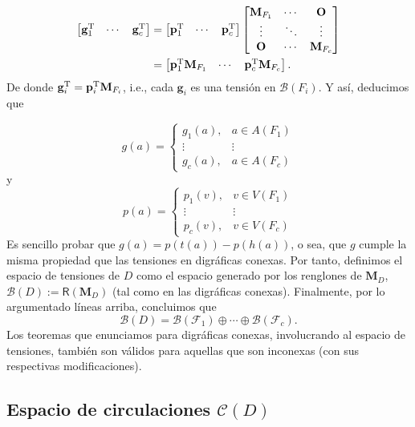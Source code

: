 \begin{align*}
    \begin{bmatrix}
\mathbf{g}_{1}^{\textnormal{T}} & \cdots  & \mathbf{g}_{c}^{\textnormal{T}} 
\end{bmatrix} &= \begin{bmatrix}
\mathbf{p}_{1}^{\textnormal{T}} & \cdots  & \mathbf{p}_{c}^{\textnormal{T}} 
\end{bmatrix} \begin{bmatrix}
\mathbf{M}_{F_{1}} & \cdots  & \mathbf{O} \\ 
\vdots & \ddots  & \vdots \\ 
\mathbf{O} & \cdots & \mathbf{M}_{F_{c}}
\end{bmatrix}\\ &= \begin{bmatrix}
 \mathbf{p}_{1}^{\textnormal{T}}\mathbf{M}_{F_{1}} & \cdots &  \mathbf{p}_{c}^{\textnormal{T}}\mathbf{M}_{F_{c}}
\end{bmatrix}.
\end{align*}
De donde $\mathbf{g}_{i}^{\textnormal{T}} = \mathbf{p}_{i}^{\textnormal{T}}\mathbf{M}_{F_{i}}$, i.e., cada $\mathbf{g}_{i}$ es una tensión en $\mathcal{B}(F_{i})$. Y así, deducimos que

$$
g(a) = \left\{\begin{matrix}
g_{1}(a), & a \in A(F_{1})\\ 
\vdots & \vdots \\ 
g_{c}(a), & a \in A(F_{c})
\end{matrix}\right.
$$
y
$$
p(a) = \left\{\begin{matrix}
p_{1}(v), & v \in V(F_{1})\\ 
\vdots & \vdots \\ 
p_{c}(v), & v \in V(F_{c})
\end{matrix}\right.
$$
Es sencillo probar que $g(a) = p(t(a)) - p(h(a))$, o sea, que $g$ cumple la misma propiedad que las tensiones en digráficas conexas. Por tanto, definimos  el espacio de tensiones de $D$ como el espacio generado por los renglones de $\mathbf{M}_{D}$, $\mathcal{B}(D):=\mathsf{R}(\mathbf{M}_{D})$ (tal como en las digráficas conexas). Finalmente, por lo argumentado líneas arriba, concluimos que
$$
\mathcal{B}(D) = \mathcal{B}(\mathcal{F}_{1}) \oplus \cdots \oplus \mathcal{B}(\mathcal{F}_{c}).
$$
Los teoremas que enunciamos para digráficas conexas, involucrando al espacio de tensiones, también son válidos para aquellas que son inconexas (con sus respectivas modificaciones).


\subsection{Espacio de circulaciones $\mathcal{C}(D)$}

